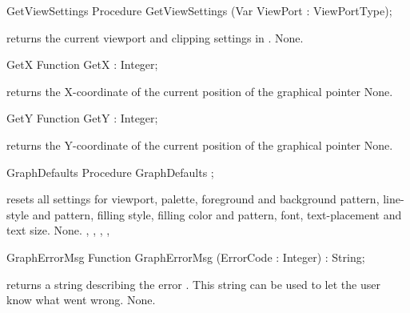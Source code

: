 \begin{procedure}{GetViewSettings}
\Declaration
Procedure GetViewSettings (Var ViewPort : ViewPortType);

\Description
{} returns the current viewport and clipping settings in
.
\Errors
None.
\SeeAlso
{}
\end{procedure}

\begin{function}{GetX}
\Declaration
Function GetX  : Integer;

\Description
{} returns the X-coordinate of the current position of
the graphical pointer
\Errors
None.
\SeeAlso
{}
\end{function}

\begin{function}{GetY}
\Declaration
Function GetY  : Integer;

\Description
{} returns the Y-coordinate of the current position of
the graphical pointer
\Errors
None.
\SeeAlso
{}
\end{function}

\begin{procedure}{GraphDefaults}
\Declaration
Procedure GraphDefaults ;

\Description
{} resets all settings for viewport, palette,
foreground and background pattern, line-style and pattern, filling style,
filling color and pattern, font, text-placement and
text size.
\Errors
None.
\SeeAlso
{}, , ,
, 
\end{procedure}

\begin{function}{GraphErrorMsg}
\Declaration
Function GraphErrorMsg (ErrorCode : Integer) : String;

\Description
{}
returns a string describing the error . This string can be
used to let the user know what went wrong.
\Errors
None.
\SeeAlso
{}
\end{function}

